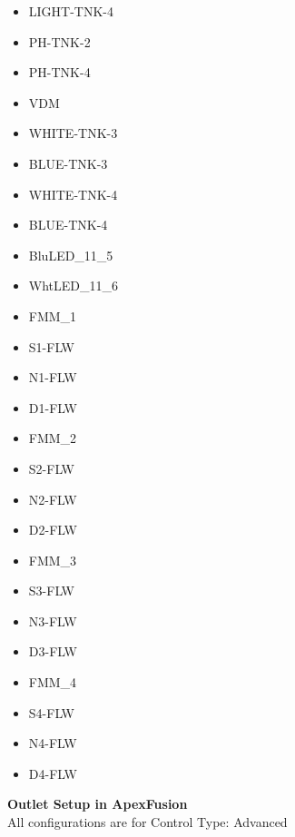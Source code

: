 \documentclass[]{book}
\begin{document}
\begin{itemize}
\item
  LIGHT-TNK-4
\item
  PH-TNK-2
\item
  PH-TNK-4
\item
  VDM
\item
  WHITE-TNK-3
\item
  BLUE-TNK-3
\item
  WHITE-TNK-4
\item
  BLUE-TNK-4
\item
  BluLED\_11\_5
\item
  WhtLED\_11\_6
\item
  FMM\_1
\item
  S1-FLW
\item
  N1-FLW
\item
  D1-FLW
\item
  FMM\_2
\item
  S2-FLW
\item
  N2-FLW
\item
  D2-FLW
\item
  FMM\_3
\item
  S3-FLW
\item
  N3-FLW
\item
  D3-FLW
\item
  FMM\_4
\item
  S4-FLW
\item
  N4-FLW
\item
  D4-FLW
\end{itemize}

 \textbf{Outlet Setup in ApexFusion}\\
All configurations are for Control Type: Advanced
\end{document}
